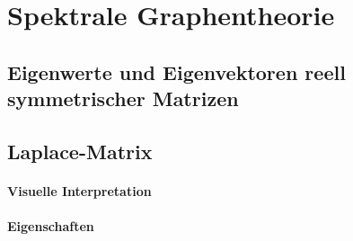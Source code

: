 \section{Spektrale Graphentheorie}
\label{spektrale_graphentheorie}

\subsection{Eigenwerte und Eigenvektoren reell symmetrischer Matrizen}
\label{eigenwerte_symmetrischer_matrizen}

\subsection{Laplace-Matrix}
\label{laplace_matrix}

\paragraph{Visuelle Interpretation}
\label{laplace_interpretation}

\paragraph{Eigenschaften}
\label{laplace_eigenschaften}
